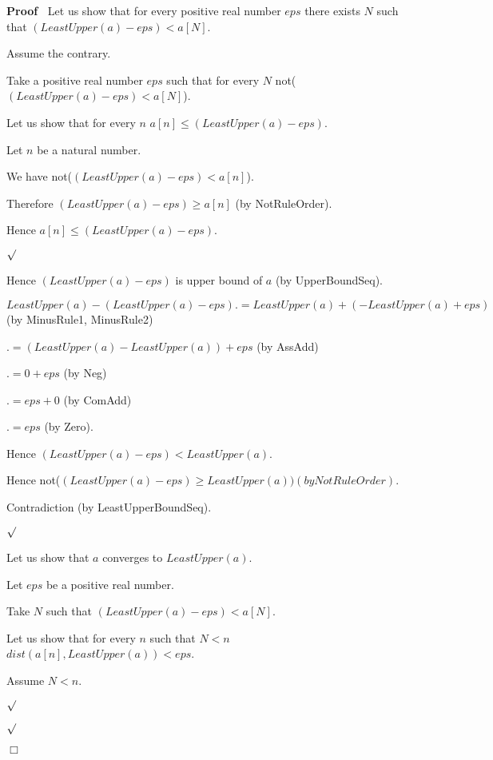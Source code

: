 \documentclass{article}
\newenvironment{forthel}{\begin{leftbar}}{\end{leftbar}}
\newenvironment{proof}{\noindent\textbf{Proof\ }}{\hspace*{\fill}$\Box$\medskip}
\newenvironment{subproof}{\begin{list}{}{}
		\item[\text{Proof}]}{\hfill $\surd$ \end{list}}
\begin{document}
\begin{forthel}
\begin{proof}
		Let us show that for every positive real number $eps$ there exists $N$ such that $(LeastUpper(a) - eps) < a[N]$.
		
		\begin{subproof}
			Assume the contrary.
			
			Take a positive real number $eps$ such that for every $N$ not($(LeastUpper(a) - eps) < a[N]$).
			
			Let us show that for every $n$ $a[n] \leq (LeastUpper(a) - eps)$.
			
			\begin{subproof}
				Let $n$ be a natural number.
				
				We have not($(LeastUpper(a) - eps) < a[n]$).
				
				Therefore $(LeastUpper(a) - eps) \geq a[n]$ (by NotRuleOrder).
				
				Hence $a[n] \leq (LeastUpper(a) - eps)$.
				
			\end{subproof}
			
			Hence $(LeastUpper(a) - eps)$ is upper bound of $a$ (by UpperBoundSeq).
			
			$LeastUpper(a) - (LeastUpper(a) - eps) .= LeastUpper(a) + (-LeastUpper(a) + eps)$ (by MinusRule1, MinusRule2)
			
			$.= (LeastUpper(a) - LeastUpper(a)) + eps$ (by AssAdd)
			
			$.= 0 + eps$ (by Neg)
			
			$.= eps + 0$ (by ComAdd)
			
			$.= eps$ (by Zero).
			
			Hence $(LeastUpper(a) - eps) < LeastUpper(a)$.
			
			Hence not($(LeastUpper(a) - eps) \geq LeastUpper(a)) (by NotRuleOrder)$.
			
			Contradiction (by LeastUpperBoundSeq).
			
		\end{subproof}
		
		Let us show that $a$ converges to $LeastUpper(a)$.
		
		\begin{subproof}
			Let $eps$ be a positive real number.
			
			Take $N$ such that $(LeastUpper(a) - eps) < a[N]$.
			
			Let us show that for every $n$ such that $N < n$ $dist(a[n],LeastUpper(a)) < eps$.
			
			\begin{subproof}
				Assume $N < n$.
				

\end{subproof}
\end{subproof}
\end{proof}
\end{forthel}
\end{document}
